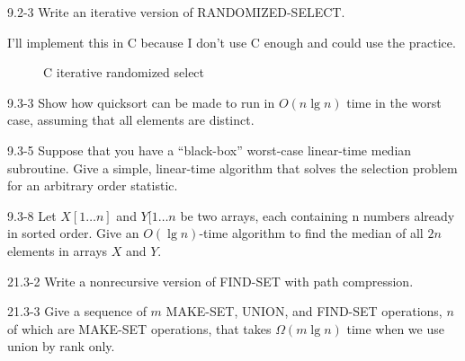 

\usepackage{listings}




\homeworkheader{\classnameandsection}

\begin{problem}{9.2-3}
  Write an iterative version of RANDOMIZED-SELECT.
  \begin{solution}
    I'll implement this in C because I don't use C enough and could use the practice.
    \begin{figure}[H]
      \centering
      \caption{C iterative randomized select}
      
    \end{figure}
  \end{solution}
\end{problem}

\begin{problem}{9.3-3}
  Show how quicksort can be made to run in $O(n \lg n)$ time in the worst case, assuming that all elements are
  distinct.
\end{problem}

\begin{problem}{9.3-5}
  Suppose that you have a ``black-box'' worst-case linear-time median subroutine. Give a simple, linear-time algorithm
  that solves the selection problem for an arbitrary order statistic.
\end{problem}

\begin{problem}{9.3-8}
  Let $X[1\ldots n]$ and $Y[1\ldots n$ be two arrays, each containing n numbers already in sorted order. Give an $O(\lg
  n)$-time algorithm to find the median of all $2n$ elements in arrays $X$ and $Y$.
\end{problem}

\begin{problem}{21.3-2}
  Write a nonrecursive version of FIND-SET with path compression.
\end{problem}

\begin{problem}{21.3-3}
  Give a sequence of $m$ MAKE-SET, UNION, and FIND-SET operations, $n$ of which are MAKE-SET operations, that takes
  $\Omega(m \lg n)$ time when we use union by rank only.
\end{problem}


